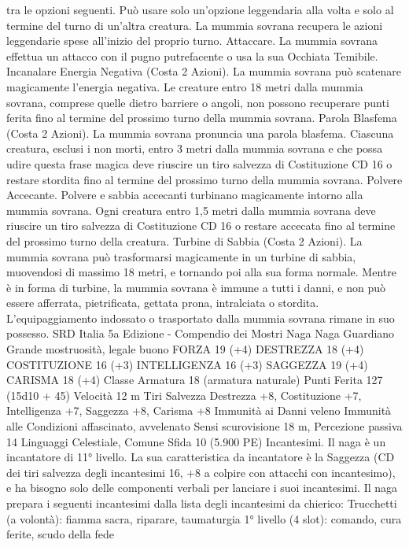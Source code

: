 \begin{multicols}{2}
tra le opzioni seguenti. Può usare solo un’opzione leggendaria
alla volta e solo al termine del turno di un’altra creatura. La
mummia sovrana recupera le azioni leggendarie spese all’inizio
del proprio turno.
Attaccare. La mummia sovrana effettua un attacco con il pugno
putrefacente o usa la sua Occhiata Temibile.
Incanalare Energia Negativa (Costa 2 Azioni). La mummia
sovrana può scatenare magicamente l’energia negativa. Le
creature entro 18 metri dalla mummia sovrana, comprese quelle
dietro barriere o angoli, non possono recuperare punti ferita fino
al termine del prossimo turno della mummia sovrana.
Parola Blasfema (Costa 2 Azioni). La mummia sovrana
pronuncia una parola blasfema. Ciascuna creatura, esclusi i non
morti, entro 3 metri dalla mummia sovrana e che possa udire
questa frase magica deve riuscire un tiro salvezza di Costituzione
CD 16 o restare stordita fino al termine del prossimo turno della
mummia sovrana.
Polvere Accecante. Polvere e sabbia accecanti turbinano
magicamente intorno alla mummia sovrana. Ogni creatura entro
1,5 metri dalla mummia sovrana deve riuscire un tiro salvezza di
Costituzione CD 16 o restare accecata fino al termine del
prossimo turno della creatura.
Turbine di Sabbia (Costa 2 Azioni). La mummia sovrana può
trasformarsi magicamente in un turbine di sabbia, muovendosi di
massimo 18 metri, e tornando poi alla sua forma normale.
Mentre è in forma di turbine, la mummia sovrana è immune a
tutti i danni, e non può essere afferrata, pietrificata, gettata prona,
intralciata o stordita. L’equipaggiamento indossato o trasportato
dalla mummia sovrana rimane in suo possesso.
SRD Italia 5a Edizione - Compendio dei Mostri
Naga
Naga Guardiano
Grande mostruosità, legale buono
FORZA 19 (+4)
DESTREZZA 18 (+4)
COSTITUZIONE 16 (+3)
INTELLIGENZA 16 (+3)
SAGGEZZA 19 (+4)
CARISMA 18 (+4)
Classe Armatura 18 (armatura naturale)
Punti Ferita 127 (15d10 + 45)
Velocità 12 m
Tiri Salvezza Destrezza +8, Costituzione +7, Intelligenza +7,
Saggezza +8, Carisma +8
Immunità ai Danni veleno
Immunità alle Condizioni affascinato, avvelenato
Sensi scurovisione 18 m, Percezione passiva 14
Linguaggi Celestiale, Comune
Sfida 10 (5.900 PE)
Incantesimi. Il naga è un incantatore di 11° livello. La sua
caratteristica da incantatore è la Saggezza (CD dei tiri salvezza
degli incantesimi 16, +8 a colpire con attacchi con incantesimo),
e ha bisogno solo delle componenti verbali per lanciare i suoi
incantesimi. Il naga prepara i seguenti incantesimi dalla lista
degli incantesimi da chierico:
Trucchetti (a volontà): fiamma sacra, riparare, taumaturgia
1° livello (4 slot): comando, cura ferite, scudo della fede

\end{multicols}
